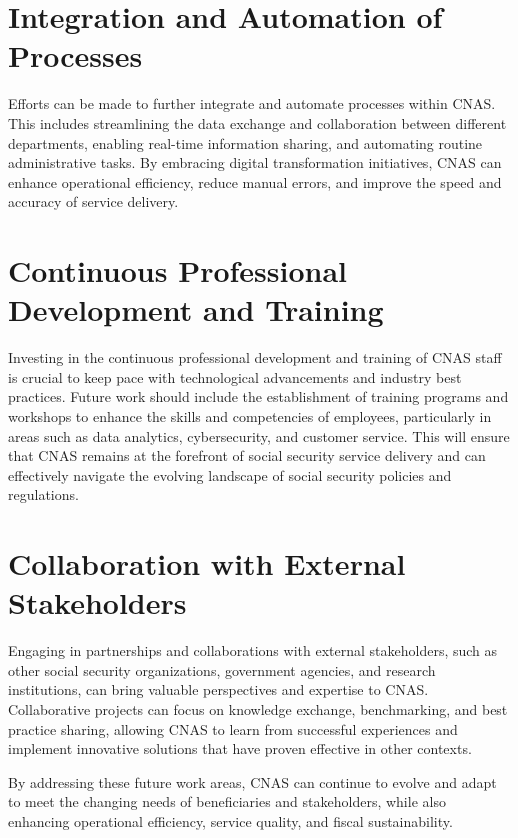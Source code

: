 \section{Integration and Automation of Processes}
\label{sec:process-automation}

Efforts can be made to further integrate and automate processes within CNAS. This includes streamlining the data exchange and collaboration between different departments, enabling real-time information sharing, and automating routine administrative tasks. By embracing digital transformation initiatives, CNAS can enhance operational efficiency, reduce manual errors, and improve the speed and accuracy of service delivery.

\section{Continuous Professional Development and Training}
\label{sec:professional-development}

Investing in the continuous professional development and training of CNAS staff is crucial to keep pace with technological advancements and industry best practices. Future work should include the establishment of training programs and workshops to enhance the skills and competencies of employees, particularly in areas such as data analytics, cybersecurity, and customer service. This will ensure that CNAS remains at the forefront of social security service delivery and can effectively navigate the evolving landscape of social security policies and regulations.

\section{Collaboration with External Stakeholders}
\label{sec:external-collaboration}

Engaging in partnerships and collaborations with external stakeholders, such as other social security organizations, government agencies, and research institutions, can bring valuable perspectives and expertise to CNAS. Collaborative projects can focus on knowledge exchange, benchmarking, and best practice sharing, allowing CNAS to learn from successful experiences and implement innovative solutions that have proven effective in other contexts.

By addressing these future work areas, CNAS can continue to evolve and adapt to meet the changing needs of beneficiaries and stakeholders, while also enhancing operational efficiency, service quality, and fiscal sustainability.

